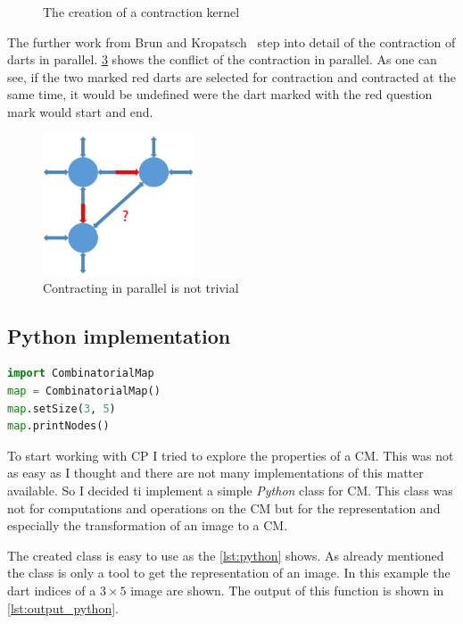 \documentclass[12pt]{article}
\begin{document}
\begin{figure}[tb]
\begin{subfigure}[b]{0.2\textwidth}
      \caption{}\label{fig:contract_kernel8}
  \end{subfigure}

  \caption{The creation of a contraction kernel}%
  \label{fig:creationg_of_a_kernel}
\end{figure}

The further work from Brun and Kropatsch~\cite{brun2003contraction} step into detail of the contraction of darts in parallel. \cref{fig:parallel} shows the conflict of the contraction in parallel. As one can see, if the two marked red darts are selected for contraction and contracted at the same time, it would be undefined were the dart marked with the red question mark would start and end.

\begin{figure}[tb]
  \centering
  \includegraphics[width=0.4\textwidth]{img/compar.pdf}
  \caption{Contracting in parallel is not trivial}%
  \label{fig:parallel}
\end{figure}


\subsection{Python implementation}%
\label{sub:python_implementation}

\begin{lstlisting}[caption={how to use the created \texttt{Python} class},label={lst:python},language=Python]
import CombinatorialMap
map = CombinatorialMap()
map.setSize(3, 5)
map.printNodes()
\end{lstlisting}

To start working with CP I tried to explore the properties of a CM\@. This was not as easy as I thought and there are not many implementations of this matter available. So I decided ti implement a simple \emph{Python} class for CM\@.
This class was not for computations and operations on the CM but for the representation and especially the transformation of an image to a CM\@.
\par
The created class is easy to use as the \cref{lst:python} shows. As already mentioned the class is only a tool to get the representation of an image. In this example the dart indices of a \( 3 \times 5 \) image are shown. The output of this function is shown in \cref{lst:output_python}.
\end{document}

